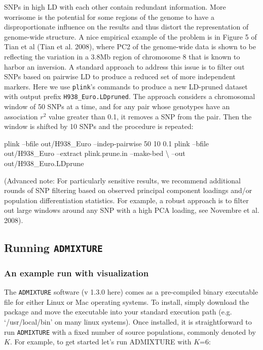 \documentclass[smallextended]{svmult}       %
\newenvironment{Shaded}{\begin{snugshade}}{\end{snugshade}}
\newcommand{\ExtensionTok}[1]{#1}
\newcommand{\NormalTok}[1]{#1}
\begin{document}
SNPs in high LD with each other contain redundant information. More
worrisome is the potential for some regions of the genome to have a
disproportionate influence on the results and thus distort the
representation of genome-wide structure. A nice empirical example of the
problem is in Figure 5 of Tian et al (Tian et al. 2008), where PC2 of
the genome-wide data is shown to be reflecting the variation in a 3.8Mb
region of chromosome 8 that is known to harbor an inversion. A standard
approach to address this issue is to filter out SNPs based on pairwise
LD to produce a reduced set of more independent markers. Here we use
\texttt{plink}'s commands to produce a new LD-pruned dataset with output
prefix \texttt{H938\_Euro.LDpruned}. The approach considers a
chromosomal window of 50 SNPs at a time, and for any pair whose
genotypes have an association \(r^2\) value greater than 0.1, it removes
a SNP from the pair. Then the window is shifted by 10 SNPs and the
procedure is repeated:

\begin{Shaded}
\begin{Highlighting}[]
\ExtensionTok{plink}\NormalTok{ --bfile out/H938_Euro --indep-pairwise 50 10 0.1}
\ExtensionTok{plink}\NormalTok{ --bfile out/H938_Euro --extract plink.prune.in --make-bed \textbackslash{}}
\NormalTok{--out out/H938_Euro.LDprune}
\end{Highlighting}
\end{Shaded}

(Advanced note: For particularly sensitive results, we recommend
additional rounds of SNP filtering based on observed principal component
loadings and/or population differentiation statistics. For example, a
robust approach is to filter out large windows around any SNP with a
high PCA loading, see Novembre et al. 2008).

\subsection{\texorpdfstring{Running
\texttt{ADMIXTURE}}{Running ADMIXTURE}}\label{running-admixture}

\subsubsection{An example run with
visualization}\label{an-example-run-with-visualization}

The \texttt{ADMIXTURE} software (v 1.3.0 here) comes as a pre-compiled
binary executable file for either Linux or Mac operating systems. To
install, simply download the package and move the executable into your
standard execution path (e.g. `/usr/local/bin' on many linux systems).
Once installed, it is straightforward to run \texttt{ADMIXTURE} with a
fixed number of source populations, commonly denoted by \(K\). For
example, to get started let's run ADMIXTURE with \(K\)=6:
\end{document}
